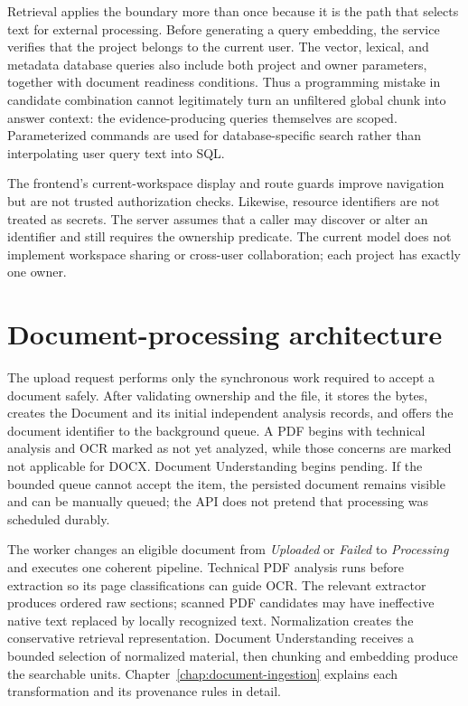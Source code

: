 Retrieval applies the boundary more than once because it is the path that
selects text for external processing. Before generating a query embedding, the
service verifies that the project belongs to the current user. The vector,
lexical, and metadata database queries also include both project and owner
parameters, together with document readiness conditions. Thus a programming
mistake in candidate combination cannot legitimately turn an unfiltered global
chunk into answer context: the evidence-producing queries themselves are
scoped. Parameterized commands are used for database-specific search rather
than interpolating user query text into SQL.

The frontend's current-workspace display and route guards improve navigation
but are not trusted authorization checks. Likewise, resource identifiers are
not treated as secrets. The server assumes that a caller may discover or alter
an identifier and still requires the ownership predicate. The current model
does not implement workspace sharing or cross-user collaboration; each project
has exactly one owner.

\section{Document-processing architecture}
\label{sec:document-processing-architecture}

The upload request performs only the synchronous work required to accept a
document safely. After validating ownership and the file, it stores the bytes,
creates the Document and its initial independent analysis records, and offers
the document identifier to the background queue. A PDF begins with technical
analysis and OCR marked as not yet analyzed, while those concerns are marked
not applicable for DOCX. Document Understanding begins pending. If the bounded
queue cannot accept the item, the persisted document remains visible and can
be manually queued; the API does not pretend that processing was scheduled
durably.

The worker changes an eligible document from \emph{Uploaded} or \emph{Failed}
to \emph{Processing} and executes one coherent pipeline. Technical PDF analysis
runs before extraction so its page classifications can guide OCR. The relevant
extractor produces ordered raw sections; scanned PDF candidates may have
ineffective native text replaced by locally recognized text. Normalization
creates the conservative retrieval representation. Document Understanding
receives a bounded selection of normalized material, then chunking and
embedding produce the searchable units. Chapter~\ref{chap:document-ingestion} explains each transformation
and its provenance rules in detail.

